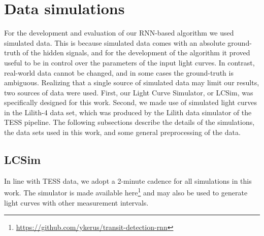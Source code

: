 
\section{Data simulations}

For the development and evaluation of our RNN-based algorithm we used simulated data. This is because simulated data comes with an absolute ground-truth of the hidden signals, and for the development of the algorithm it proved useful to be in control over the parameters of the input light curves. In contrast, real-world data cannot be changed, and in some cases the ground-truth is ambiguous. Realizing that a single source of simulated data may limit our results, two sources of data were used. First, our Light Curve Simulator, or LCSim, was specifically designed for this work. Second, we made use of simulated light curves in the Lilith-4 data set, which was produced by the Lilith data simulator of the TESS pipeline. The following subsections describe the details of the simulations, the data sets used in this work, and some general preprocessing of the data.

\subsection{LCSim}
\label{sec:lcsim}

In line with TESS data, we adopt a 2-minute cadence for all simulations in this work. The simulator is made available here\footnote{\url{https://github.com/ykerus/transit-detection-rnn}} and may also be used to generate light curves with other measurement intervals.

